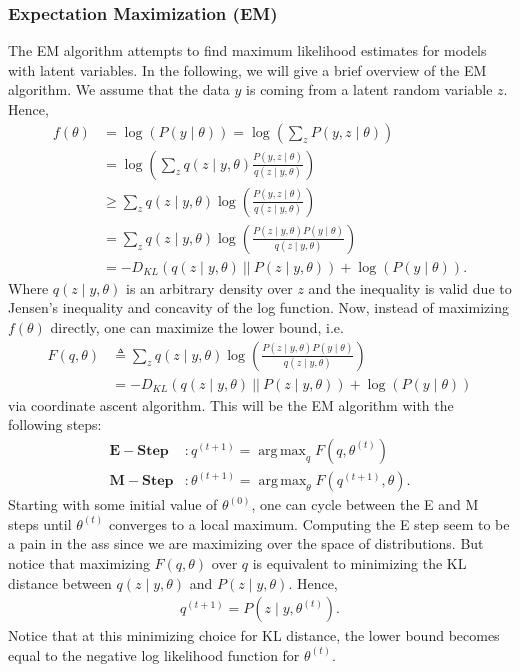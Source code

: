 \documentclass[10pt ]{article}
\DeclareMathOperator*{\argmaxA}{arg\,max}
\begin{document}
\subsubsection{Expectation Maximization (EM)}
The EM algorithm attempts to find maximum likelihood estimates for models with latent variables. In the following, we will give a brief overview of the EM algorithm. We assume that the data $y$ is coming from a latent random variable $z$. Hence,
\begin{align}
f(\theta) &= \log \left( P(y \mid \theta) \right) = \log \left( \sum_z P(y,z \mid \theta)\right) \nonumber \\
&= \log \left( \sum_z q(z \mid y, \theta) \frac{P(y,z \mid \theta)}{q(z \mid y, \theta)}\right) \nonumber \\
&\ge \sum_z q(z \mid y, \theta) \log \left( \frac{P(y,z \mid \theta)}{q(z \mid y, \theta)} \right) \nonumber \\
&= \sum_z q(z \mid y, \theta) \log \left( \frac{P(z \mid y, \theta) P(y \mid \theta)}{q(z \mid y, \theta)} \right) \nonumber \\
&= - D_{KL}\left( q(z \mid y, \theta) ~ ||~ P(z \mid y, \theta) \right) + \log \left( P(y \mid \theta) \right).
\end{align}
Where $ q(z \mid y, \theta) $ is an arbitrary density over $z$ and the inequality is valid due to Jensen's inequality and concavity of the log function. Now, instead of maximizing $f(\theta)$ directly, one can maximize the lower bound, i.e.
\begin{align}
F(q, \theta) &\triangleq \sum_z q(z \mid y, \theta) \log \left( \frac{P(z \mid y, \theta) P(y \mid \theta)}{q(z \mid y, \theta)} \right) \nonumber \\
&= - D_{KL}\left( q(z \mid y, \theta) ~ ||~ P(z \mid y, \theta) \right) + \log \left( P(y \mid \theta) \right)
\end{align}
via coordinate ascent algorithm. This will be the EM algorithm with the following steps:
\begin{align}
\mathbf{E-Step} &: q^{(t+1)} = \argmaxA_{q} F(q, \theta^{(t)}) \\
\mathbf{M-Step} &: \theta^{(t+1)} = \argmaxA_{\theta} F(q^{(t+1)}, \theta).
\end{align}
Starting with some initial value of $\theta^{(0)}$, one can cycle between the E and M steps until $\theta^{(t)}$ converges to a local maximum. Computing the E step seem to be a pain in the ass since we are maximizing over the space of distributions. But notice that maximizing $F(q, \theta)$ over $q$ is equivalent to minimizing the KL distance between $q(z \mid y, \theta)$  and $P(z \mid y, \theta) $. Hence, 
\begin{align}
q^{(t+1)} = P(z \mid y, \theta^{(t)}).
\label{eq_q_t_1}
\end{align}
Notice that at this minimizing choice for KL distance, the lower bound becomes equal to the negative log likelihood function for $\theta^{(t)}$. 
\end{document}
